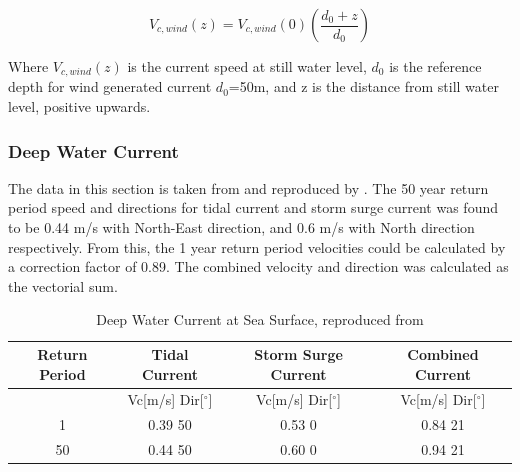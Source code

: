   \begin{equation}
      V_{c,wind}(z)= V_{c,wind}(0) \left( \frac{d_0+z}{d_0}\right)
  \end{equation}
  
  \noindent Where $ V_{c,wind}(z)$ is the current speed at still water level, $d_0$ is the reference depth for wind generated current $d_0$=50m, and z is the distance from still water level, positive upwards. \newline
  \newline
  
\subsubsection{Deep Water Current } 
 The data in this section is taken from \cite{hseenironmental} and reproduced by \cite{Lifes50+D1.1}.\newline
   \newline
   The 50 year return period speed and directions for tidal current and storm surge current was found to be 0.44 m/s with North-East direction, and 0.6 m/s with North direction respectively. From this, the 1 year return period velocities could be calculated by a correction factor of 0.89. The combined velocity and direction was calculated as the vectorial sum.
   
   
\begin{table} [H]
\centering
\begin{tabular}{ |c|c|c|c|}
\hline
Return Period & Tidal Current & Storm Surge Current & Combined Current \\
 \hline
 \hline
 & Vc[m/s] \hspace{0.3cm} Dir[$^{\circ}$] &  Vc[m/s] \hspace{0.3cm} Dir[$^{\circ}$] & Vc[m/s] \hspace{0.3cm} Dir[$^{\circ}$] \\
 \hline
 1 & 0.39 \hspace{0.7cm} 50 & 0.53 \hspace{0.7cm} 0  & 0.84 \hspace{0.7cm} 21 \\
 50 & 0.44 \hspace{0.7cm} 50 & 0.60 \hspace{0.7cm} 0  & 0.94 \hspace{0.7cm} 21 \\
 \hline
\end{tabular}
\caption{Deep Water Current at Sea Surface, reproduced from \cite{Lifes50+D1.1}}
\label{table:tidcur}
\end{table} 

